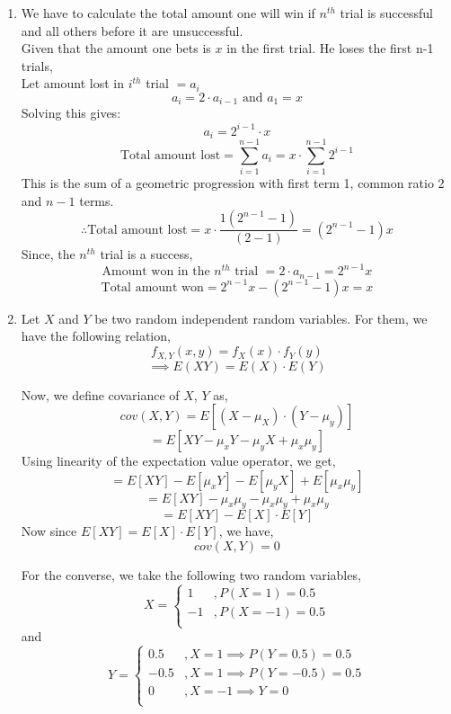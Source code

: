 \documentclass[11pt]{article}
\begin{document}
\begin{enumerate}
	\item{
    	We have to calculate the total amount one will win if $ n^{th} $  trial is successful and all others before it are unsuccessful.\\
        Given that the amount one bets is $ x $ in the first trial. He loses the first n-1 trials,\\
        Let amount lost in $ i^{th} $ trial $= a_i$\\
        $$a_i = 2 \cdot a_{i-1}  \text{ and }  a_1 = x$$
        Solving this gives: \\
        $$a_i = 2^{i-1} \cdot x$$
        $$\text{Total amount lost} = \sum_{i=1}^{n-1}a_i = x \cdot \sum_{i=1}^{n-1}2^{i-1}$$
        This is the sum of a geometric progression with first term 1, common ratio 2 and $n-1$ terms.\\
        $$\therefore \text{Total amount lost} = x \cdot \frac{1(2^{n-1}-1)}{(2-1)} = (2^{n-1}-1)x$$
        Since, the $n^{th}$ trial is a success,\\
        $$\text{Amount won in the } n^{th} \text{ trial }  = 2\cdot a_{n-1} = 2^{n-1}x$$
        $$\text{Total amount won} = 2^{n-1}x - (2^{n-1}-1)x = x$$
	}	

	\item{
		Let $X$ and $Y$ be two random independent random variables. For them, we have the following relation,
		$$f_{X,Y}(x,y) = f_X(x)\cdot f_Y(y)$$
		$$\implies E(XY) = E(X)\cdot E(Y)  $$

		Now, we define covariance of $X$, $Y$ as, 
		$$ cov(X,Y) = E[(X-\mu_X)\cdot(Y-\mu_y)] $$
		$$ = E[XY - \mu_xY - \mu_yX + \mu_x\mu_y]$$
		Using linearity of the expectation value operator, we get,
		$$ = E[XY] - E[\mu_xY] - E[\mu_yX] + E[\mu_x\mu_y]$$
		$$ = E[XY] - \mu_x\mu_y - \mu_x\mu_y + \mu_x\mu_y$$
		$$ = E[XY] - E[X]\cdot E[Y] $$
		Now since $E[XY] = E[X]\cdot E[Y]$, we have,
		$$cov(X,Y) = 0 $$

		For the converse, we take the following two random variables,
		\[X =  \begin{cases} 
		      1 &  ,P(X=1) = 0.5 \\
		      -1 &  ,P(X=-1) = 0.5\\
		   \end{cases}
		\]
		and
		\[Y =  \begin{cases} 
		      0.5 & ,X=1 \implies P(Y=0.5)=0.5 \\
		      -0.5 & ,X=1 \implies P(Y=-0.5)=0.5  \\
		      0 & ,X = -1 \implies Y=0 \\
		   \end{cases}
		\]

}
\end{enumerate}
\end{document}
